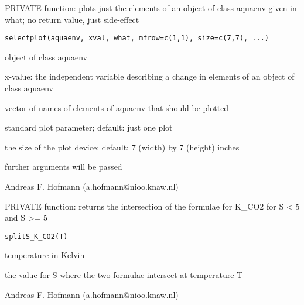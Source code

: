 \documentclass{article}
\begin{document}
\begin{Description}\relax
PRIVATE function: plots just the elements of an object of class aquaenv given in what; no return value, just side-effect
\end{Description}
\begin{Usage}
\begin{verbatim}selectplot(aquaenv, xval, what, mfrow=c(1,1), size=c(7,7), ...)\end{verbatim}
\end{Usage}
\begin{Arguments}
\begin{ldescription}
\item[\code{aquaenv }] object of class aquaenv
\item[\code{xval }] x-value: the independent variable describing a change in elements of an object of class aquaenv
\item[\code{what }] vector of names of elements of aquaenv that should be plotted
\item[\code{mfrow }] standard plot parameter; default: just one plot
\item[\code{size }] the size of the plot device; default: 7 (width) by 7 (height) inches
\item[\code{... }] further arguments will be passed
\end{ldescription}
\end{Arguments}
\begin{Author}\relax
Andreas F. Hofmann (a.hofmann@nioo.knaw.nl)
\end{Author}

\begin{Description}\relax
PRIVATE function: returns the intersection of the formulae for K\_CO2 for S < 5 and S >= 5
\end{Description}
\begin{Usage}
\begin{verbatim}splitS_K_CO2(T)\end{verbatim}
\end{Usage}
\begin{Arguments}
\begin{ldescription}
\item[\code{T }] temperature in Kelvin
\end{ldescription}
\end{Arguments}
\begin{Value}
the value for S where the two formulae intersect at temperature T
\end{Value}
\begin{Author}\relax
Andreas F. Hofmann (a.hofmann@nioo.knaw.nl)
\end{Author}
\end{document}
